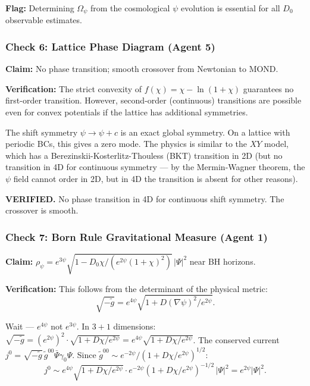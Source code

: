 \documentclass[11pt,a4paper]{article}
\begin{document}
\textbf{Flag:} Determining $\Omega_\psi$ from the cosmological $\psi$ evolution is essential for all $D_0$ observable estimates.

\subsubsection{Check 6: Lattice Phase Diagram (Agent 5)}

\textbf{Claim:} No phase transition; smooth crossover from Newtonian to MOND.

\textbf{Verification:} The strict convexity of $f(\chi) = \chi - \ln(1+\chi)$ guarantees no first-order transition. However, second-order (continuous) transitions are possible even for convex potentials if the lattice has additional symmetries.

The shift symmetry $\psi \to \psi + c$ is an exact global symmetry. On a lattice with periodic BCs, this gives a zero mode. The physics is similar to the $XY$ model, which has a Berezinskii-Kosterlitz-Thouless (BKT) transition in 2D (but no transition in 4D for continuous symmetry --- by the Mermin-Wagner theorem, the $\psi$ field cannot order in 2D, but in 4D the transition is absent for other reasons).

\textcolor{dfdgreen}{\textbf{VERIFIED.}} No phase transition in 4D for continuous shift symmetry. The crossover is smooth.

\subsubsection{Check 7: Born Rule Gravitational Measure (Agent 1)}

\textbf{Claim:} $\rho_\psi = e^{3\psi}\sqrt{1-D_0\chi/(e^{2\psi}(1+\chi)^2)}\,|\Psi|^2$ near BH horizons.

\textbf{Verification:} This follows from the determinant of the physical metric:
\begin{equation}
\sqrt{-\tilde{g}} = e^{4\psi}\sqrt{1 + D(\nabla\psi)^2/e^{2\psi}}.
\end{equation}

Wait --- $e^{4\psi}$ not $e^{3\psi}$. In $3+1$ dimensions: $\sqrt{-\tilde{g}} = (e^{2\psi})^2 \cdot \sqrt{1+D\chi/e^{2\psi}} = e^{4\psi}\sqrt{1+D\chi/e^{2\psi}}$. The conserved current $j^0 = \sqrt{-\tilde{g}}\,\tilde{g}^{00}\bar\Psi\gamma_0\Psi$. Since $\tilde{g}^{00} \sim e^{-2\psi}/(1+D\chi/e^{2\psi})^{1/2}$:
\begin{equation}
j^0 \sim e^{4\psi}\sqrt{1+D\chi/e^{2\psi}} \cdot e^{-2\psi}(1+D\chi/e^{2\psi})^{-1/2}\,|\Psi|^2 = e^{2\psi}|\Psi|^2.
\end{equation}
\end{document}
